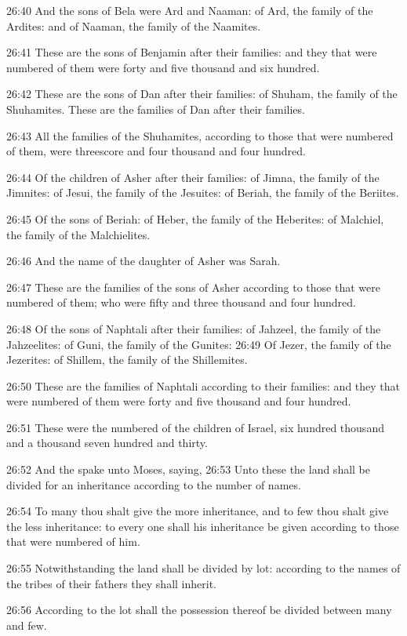 26:40 And the sons of Bela were Ard and Naaman: of Ard, the family of
the Ardites: and of Naaman, the family of the Naamites.

26:41 These are the sons of Benjamin after their families: and they
that were numbered of them were forty and five thousand and six
hundred.

26:42 These are the sons of Dan after their families: of Shuham, the
family of the Shuhamites. These are the families of Dan after their
families.

26:43 All the families of the Shuhamites, according to those that were
numbered of them, were threescore and four thousand and four hundred.

26:44 Of the children of Asher after their families: of Jimna, the
family of the Jimnites: of Jesui, the family of the Jesuites: of
Beriah, the family of the Beriites.

26:45 Of the sons of Beriah: of Heber, the family of the Heberites: of
Malchiel, the family of the Malchielites.

26:46 And the name of the daughter of Asher was Sarah.

26:47 These are the families of the sons of Asher according to those
that were numbered of them; who were fifty and three thousand and four
hundred.

26:48 Of the sons of Naphtali after their families: of Jahzeel, the
family of the Jahzeelites: of Guni, the family of the Gunites: 26:49
Of Jezer, the family of the Jezerites: of Shillem, the family of the
Shillemites.

26:50 These are the families of Naphtali according to their families:
and they that were numbered of them were forty and five thousand and
four hundred.

26:51 These were the numbered of the children of Israel, six hundred
thousand and a thousand seven hundred and thirty.

26:52 And the \LORD spake unto Moses, saying, 26:53 Unto these the land
shall be divided for an inheritance according to the number of names.

26:54 To many thou shalt give the more inheritance, and to few thou
shalt give the less inheritance: to every one shall his inheritance be
given according to those that were numbered of him.

26:55 Notwithstanding the land shall be divided by lot: according to
the names of the tribes of their fathers they shall inherit.

26:56 According to the lot shall the possession thereof be divided
between many and few.

